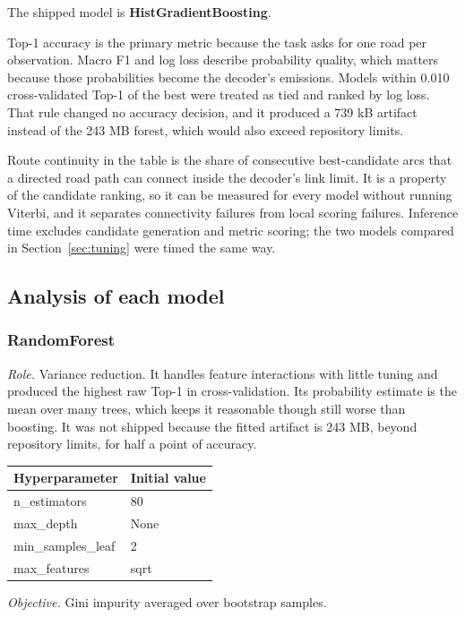 \documentclass[11pt,a4paper]{article}
\begin{document}
The shipped model is \textbf{HistGradientBoosting}.

Top-1 accuracy is the primary metric because the task asks for one road per observation. Macro F1
and log loss describe probability quality, which matters because those probabilities become the
decoder's emissions. Models within 0.010 cross-validated Top-1 of the best were treated as tied and
ranked by log loss. That rule changed no accuracy decision, and it produced a 739 kB artifact instead of the 243 MB forest, which would also exceed repository limits.

Route continuity in the table is the share of consecutive best-candidate arcs that a directed road
path can connect inside the decoder's link limit. It is a property of the candidate ranking, so it can
be measured for every model without running Viterbi, and it separates connectivity failures from
local scoring failures. Inference time excludes candidate generation and metric scoring; the two models
compared in Section~\ref{sec:tuning} were timed the same way.

\subsection{Analysis of each model}
\subsubsection*{RandomForest}
\noindent\textit{Role.} Variance reduction. It handles feature interactions with little tuning and produced the highest raw Top-1 in cross-validation. Its probability estimate is the mean over many trees, which keeps it reasonable though still worse than boosting. It was not shipped because the fitted artifact is 243 MB, beyond repository limits, for half a point of accuracy.

\begin{center}\small\begin{tabular}{@{}ll@{}}\toprule\textbf{Hyperparameter} & \textbf{Initial value} \\ \midrule
n\_estimators & 80 \\
max\_depth & None \\
min\_samples\_leaf & 2 \\
max\_features & sqrt \\
\bottomrule\end{tabular}\end{center}

\noindent\textit{Objective.} Gini impurity averaged over bootstrap samples.
\end{document}
